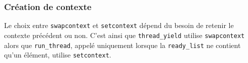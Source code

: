 \subsubsection{Création de contexte}
Le choix entre \texttt{swapcontext} et \texttt{setcontext} dépend du
 besoin de retenir le contexte précédent ou non. C'est ainsi que 
\texttt{thread\_yield} utilise \texttt{swapcontext} alors que 
\texttt{run\_thread}, appelé uniquement lorsque la \texttt{ready\_list}
ne contient qu'un élément, utilise \texttt{setcontext}. 